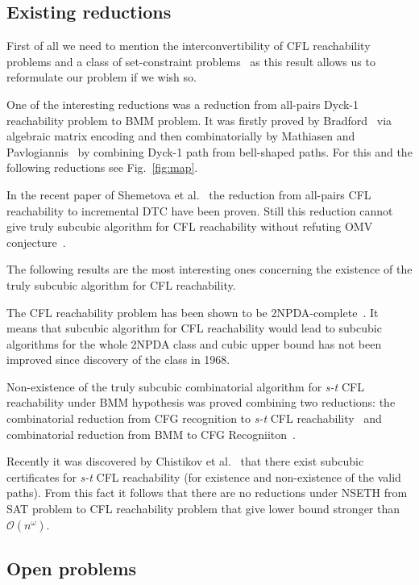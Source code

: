 \documentclass[acmsmall,nonacm]{acmart}
\begin{document}
	\subsection{Existing reductions}
	
	First of all we need to mention the interconvertibility of CFL reachability problems and a class of set-constraint problems~\cite{10.1145/258994.259006} as this result allows us to reformulate our problem if we wish so.
	
	One of the interesting reductions was a reduction from  all-pairs Dyck-1 reachability problem to BMM problem. It was firstly proved by Bradford~\cite{bradford2017efficient} via algebraic matrix encoding and then combinatorially by Mathiasen and Pavlogiannis~\cite{10.1145/3434315} by combining Dyck-1 path from bell-shaped paths. For this and the following reductions see Fig.~\ref{fig:map}.
	
	In the recent paper of Shemetova et al.~\cite{shemetova2021algorithm} the reduction from all-pairs CFL reachability to incremental DTC have been proven. Still this reduction cannot give truly subcubic algorithm for CFL reachability without refuting OMV conjecture~\cite{8948597, 10.1145/2746539.2746609}.
	
	The following results are the most interesting ones concerning the existence of  the truly subcubic algorithm for CFL reachability.
	
	The CFL reachability problem has been shown to be 2NPDA-complete~\cite{10.5555/788019.788876}. It means that subcubic algorithm for CFL reachability would lead to subcubic algorithms for the whole 2NPDA class and cubic upper bound has not been improved since discovery of the class in 1968.
	
	Non-existence of the truly subcubic combinatorial algorithm for \emph{s-t} CFL reachability under BMM hypothesis was proved combining two reductions: the combinatorial reduction from CFG recognition to \emph{s-t} CFL reachability~\cite{10.1145/3158118} and combinatorial reduction from BMM to CFG Recogniiton~\cite{10.1145/505241.505242}.
	
	Recently it was discovered by Chistikov et al.~\cite{chistikov2021subcubic} that there exist subcubic certificates for \emph{s-t} CFL reachability (for existence and non-existence of the valid paths). From this fact it follows that there are no reductions under NSETH from SAT problem to CFL reachability problem that give lower bound stronger than $\mathcal{O}(n^{\omega})$.
	
	\subsection{Open problems}
	
\end{document}
